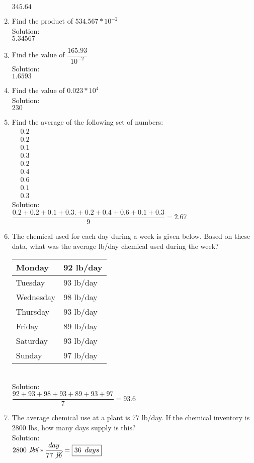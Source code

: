 \begin{enumerate}[1.]
$\boxed{345.64}$
\vspace{0.2cm}
\item Find the product of $534.567*10^{-2}$\\
Solution:\\
$\boxed{5.34567}$
\vspace{0.2cm}
\item Find the value of $\dfrac{165.93}{10^{-2}}$\\
Solution:\\
$\boxed{1.6593}$
\vspace{0.2cm}
\item Find the value of $0.023*10^4$\\
Solution:\\
$\boxed{230}$
\newpage
\item Find the average of the following set of numbers:\\
$
\begin{aligned}
&0.2 \\
&0.2 \\
&0.1 \\
&0.3 \\
&0.2 \\
&0.4 \\
&0.6 \\
&0.1 \\
&0.3
\end{aligned}$\\
\vspace{0.2cm}
Solution:\\
\vspace{0.2cm}
$\dfrac{0.2+0.2+0.1+0.3.+0.2+0.4+0.6+0.1+0.3}{9}=\boxed{2.67}$
\vspace{0.2cm}
\item The chemical used for each day during a week is given below. Based on these data, what was the average lb/day chemical used during the week?\\

\begin{tabular}{|l|l|}
\hline
Monday & 92 lb/day\\
\hline
Tuesday & 93 lb/day \\
\hline
Wednesday & 98 lb/day\\
\hline
Thursday & 93 lb/day \\
\hline
Friday & 89 lb/day\\
\hline
Saturday & 93 lb/day \\
\hline
Sunday & 97 lb/day\\
\hline
\end{tabular}\\
\vspace{0.3cm}
Solution:\\
\vspace{0.2cm}
$\dfrac{92+93+98+93+89+93+97}{7}=\boxed{93.6}$
\vspace{0.2cm}
\item The average chemical use at a plant is 77 lb/day. If the chemical inventory is 2800 lbs, how many days supply is this?\\
Solution:\\
$2800 \enspace \cancel{lbs} * \dfrac{day}{77 \enspace \cancel{lb}}=\boxed{36 \enspace days}$
\end{enumerate}

